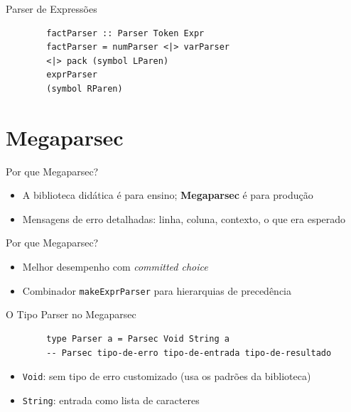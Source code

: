 \begin{frame}[fragile]{Parser de Expressões}

    \begin{lstlisting}
        factParser :: Parser Token Expr
        factParser = numParser <|> varParser
        <|> pack (symbol LParen)
        exprParser
        (symbol RParen)
    \end{lstlisting}
\end{frame}


\section{Megaparsec}\label{megaparsec}

\begin{frame}{Por que Megaparsec?}

    \begin{itemize}

        \item
        A biblioteca didática é para ensino; \textbf{Megaparsec} é para
        produção
        \item
        Mensagens de erro detalhadas: linha, coluna, contexto, o que era
        esperado
    \end{itemize}
\end{frame}

\begin{frame}[fragile]{Por que Megaparsec?}

    \begin{itemize}

        \item
        Melhor desempenho com \emph{committed choice}
        \item
        Combinador \texttt{makeExprParser} para hierarquias
        de precedência
    \end{itemize}
\end{frame}

\begin{frame}[fragile]{O Tipo Parser no Megaparsec}

    \begin{lstlisting}
        type Parser a = Parsec Void String a
        -- Parsec tipo-de-erro tipo-de-entrada tipo-de-resultado
    \end{lstlisting}

    \begin{itemize}

        \item
        \texttt{Void}: sem tipo de erro customizado (usa os
        padrões da biblioteca)
        \item
        \texttt{String}: entrada como lista de caracteres
    \end{itemize}
\end{frame}

